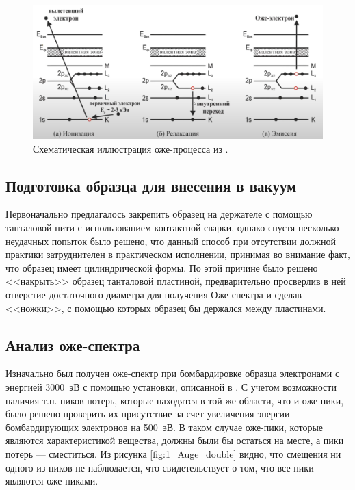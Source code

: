\documentclass[a4paper, 12pt]{article}
\begin{document}
\begin{figure}[H]
	\centering
	\includegraphics[width=0.7\linewidth]{1_diag}
	\caption{Схематическая иллюстрация оже-процесса из \cite{Auge_diag}.}
	\label{fig:1_diag}
\end{figure}

\subsection{Подготовка образца для внесения в вакуум}

Первоначально предлагалось закрепить образец на держателе с помощью танталовой нити с использованием контактной сварки, однако спустя несколько неудачных попыток было решено, что данный способ при отсутствии должной практики затруднителен в практическом исполнении, принимая во внимание факт, что образец имеет цилиндрической формы. По этой причине было решено <<накрыть>> образец танталовой пластиной, предварительно просверлив в ней отверстие достаточного диаметра для получения Оже-спектра и сделав <<ножки>>, с помощью которых образец бы держался между пластинами.


\subsection{Анализ оже-спектра}

Изначально был получен оже-спектр при бомбардировке образца электронами с энергией 3000~эВ с помощью установки, описанной в \cite{Auger_spectr}. С учетом возможности наличия т.н. пиков потерь, которые находятся в той же области, что и оже-пики, было решено проверить их присутствие за счет увеличения энергии бомбардирующих электронов на 500~эВ. В таком случае оже-пики, которые являются характеристикой вещества, должны были бы остаться на месте, а пики потерь --- сместиться. Из рисунка \ref{fig:1_Auge_double} видно, что смещения ни одного из пиков не наблюдается, что свидетельствует о том, что все пики являются оже-пиками.
\end{document}
